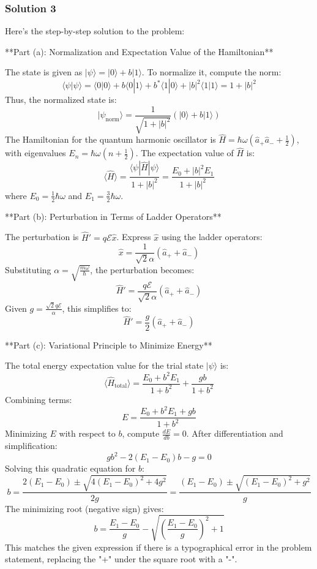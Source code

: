 \documentclass{article}
\begin{document}
\subsubsection{Solution 3}
Here's the step-by-step solution to the problem:

**Part (a): Normalization and Expectation Value of the Hamiltonian**

The state is given as \( |\psi\rangle = |0\rangle + b|1\rangle \). To normalize it, compute the norm:
\[
\langle\psi|\psi\rangle = \langle0|0\rangle + b\langle0|1\rangle + b^*\langle1|0\rangle + |b|^2\langle1|1\rangle = 1 + |b|^2
\]
Thus, the normalized state is:
\[
|\psi_{\text{norm}}\rangle = \frac{1}{\sqrt{1 + |b|^2}}(|0\rangle + b|1\rangle)
\]
The Hamiltonian for the quantum harmonic oscillator is \(\hat{H} = \hbar\omega\left(\hat{a}_+\hat{a}_- + \frac{1}{2}\right)\), with eigenvalues \(E_n = \hbar\omega\left(n + \frac{1}{2}\right)\). The expectation value of \(\hat{H}\) is:
\[
\langle\hat{H}\rangle = \frac{\langle\psi|\hat{H}|\psi\rangle}{1 + |b|^2} = \frac{E_0 + |b|^2E_1}{1 + |b|^2}
\]
where \(E_0 = \frac{1}{2}\hbar\omega\) and \(E_1 = \frac{3}{2}\hbar\omega\).

**Part (b): Perturbation in Terms of Ladder Operators**

The perturbation is \(\hat{H}' = q\mathcal{E}\hat{x}\). Express \(\hat{x}\) using the ladder operators:
\[
\hat{x} = \frac{1}{\sqrt{2}\alpha}(\hat{a}_+ + \hat{a}_-)
\]
Substituting \(\alpha = \sqrt{\frac{m\omega}{\hbar}}\), the perturbation becomes:
\[
\hat{H}' = \frac{q\mathcal{E}}{\sqrt{2}\alpha}(\hat{a}_+ + \hat{a}_-)
\]
Given \(g = \frac{\sqrt{2}q\mathcal{E}}{\alpha}\), this simplifies to:
\[
\hat{H}' = \frac{g}{2}(\hat{a}_+ + \hat{a}_-)
\]

**Part (c): Variational Principle to Minimize Energy**

The total energy expectation value for the trial state \(|\psi\rangle\) is:
\[
\langle\hat{H}_{\text{total}}\rangle = \frac{E_0 + b^2E_1}{1 + b^2} + \frac{g b}{1 + b^2}
\]
Combining terms:
\[
E = \frac{E_0 + b^2E_1 + g b}{1 + b^2}
\]
Minimizing \(E\) with respect to \(b\), compute \(\frac{dE}{db} = 0\). After differentiation and simplification:
\[
g b^2 - 2(E_1 - E_0)b - g = 0
\]
Solving this quadratic equation for \(b\):
\[
b = \frac{2(E_1 - E_0) \pm \sqrt{4(E_1 - E_0)^2 + 4g^2}}{2g} = \frac{(E_1 - E_0) \pm \sqrt{(E_1 - E_0)^2 + g^2}}{g}
\]
The minimizing root (negative sign) gives:
\[
b = \frac{E_1 - E_0}{g} - \sqrt{\left(\frac{E_1 - E_0}{g}\right)^2 + 1}
\]
This matches the given expression if there is a typographical error in the problem statement, replacing the "+" under the square root with a "-".
\end{document}

